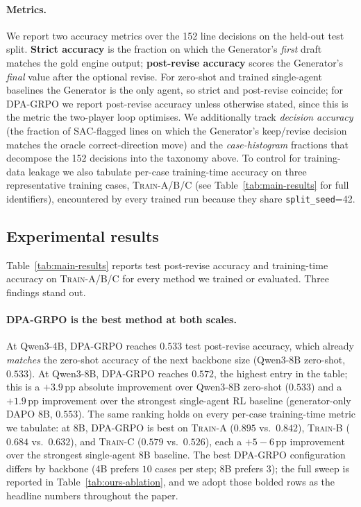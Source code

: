 \paragraph{Metrics.}
We report two accuracy metrics over the 152 line decisions on the
held-out test split. \textbf{Strict accuracy} is the fraction on which
the Generator's \emph{first} draft matches the gold engine output;
\textbf{post-revise accuracy} scores the Generator's \emph{final} value
after the optional revise. For zero-shot and trained single-agent
baselines the Generator is the only agent, so strict and post-revise
coincide; for DPA-GRPO we report post-revise accuracy unless otherwise
stated, since this is the metric the two-player loop optimises. We
additionally track \emph{decision accuracy} (the fraction of SAC-flagged
lines on which the Generator's keep/revise decision matches the
oracle correct-direction move) and the \emph{case-histogram} fractions
that decompose the 152 decisions into the taxonomy above. To control for
training-data leakage we also tabulate per-case training-time accuracy
on three representative training cases, \textsc{Train-A}/\textsc{B}/\textsc{C}
(see Table~\ref{tab:main-results} for full identifiers), encountered
by every trained run because they share \texttt{split\_seed}=42.

\subsection{Experimental results}
\label{sec:exp-results}

Table~\ref{tab:main-results} reports test post-revise accuracy and
training-time accuracy on \textsc{Train-A}/\textsc{B}/\textsc{C} for
every method we trained or evaluated. Three findings stand out.

\paragraph{DPA-GRPO is the best method at both scales.}
At Qwen3-4B, DPA-GRPO reaches $0.533$ test post-revise accuracy, which
already \emph{matches} the zero-shot accuracy of the next backbone size
(Qwen3-8B zero-shot, $0.533$). At Qwen3-8B, DPA-GRPO reaches $0.572$,
the highest entry in the table; this is a $+3.9$\,pp absolute
improvement over Qwen3-8B zero-shot ($0.533$) and a $+1.9$\,pp
improvement over the strongest single-agent RL baseline (generator-only
DAPO 8B, $0.553$). The same ranking holds on every per-case
training-time metric we tabulate: at 8B, DPA-GRPO is best on
\textsc{Train-A} ($0.895$ vs.\ $0.842$), \textsc{Train-B} ($0.684$ vs.\
$0.632$), and \textsc{Train-C} ($0.579$ vs.\ $0.526$), each a
$+5{-}6$\,pp improvement over the strongest single-agent 8B baseline.
The best DPA-GRPO configuration differs by backbone (4B prefers $10$
cases per step; 8B prefers $3$); the full sweep is reported in
Table~\ref{tab:ours-ablation}, and we adopt those bolded rows as the
headline numbers throughout the paper.

